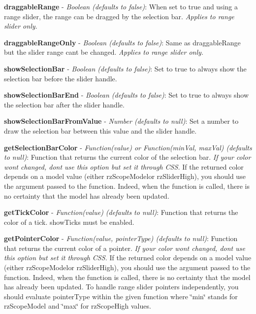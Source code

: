 {\bfseries draggable\+Range} -\/ {\itshape Boolean (defaults to false)}\+: When set to true and using a range slider, the range can be dragged by the selection bar. {\itshape Applies to range slider only.}

{\bfseries draggable\+Range\+Only} -\/ {\itshape Boolean (defaults to false)}\+: Same as draggable\+Range but the slider range can\textquotesingle{}t be changed. {\itshape Applies to range slider only.}

{\bfseries show\+Selection\+Bar} -\/ {\itshape Boolean (defaults to false)}\+: Set to true to always show the selection bar before the slider handle.

{\bfseries show\+Selection\+Bar\+End} -\/ {\itshape Boolean (defaults to false)}\+: Set to true to always show the selection bar after the slider handle.

{\bfseries show\+Selection\+Bar\+From\+Value} -\/ {\itshape Number (defaults to null)}\+: Set a number to draw the selection bar between this value and the slider handle.

{\bfseries get\+Selection\+Bar\+Color} -\/ {\itshape Function(value) or Function(min\+Val, max\+Val) (defaults to null)}\+: Function that returns the current color of the selection bar. {\itshape If your color won\textquotesingle{}t changed, don\textquotesingle{}t use this option but set it through C\+SS.} If the returned color depends on a model value (either {\ttfamily rz\+Scope\+Model}or {\ttfamily \textquotesingle{}rz\+Slider\+High}), you should use the argument passed to the function. Indeed, when the function is called, there is no certainty that the model has already been updated.

{\bfseries get\+Tick\+Color} -\/ {\itshape Function(value) (defaults to null)}\+: Function that returns the color of a tick. show\+Ticks must be enabled.

{\bfseries get\+Pointer\+Color} -\/ {\itshape Function(value, pointer\+Type) (defaults to null)}\+: Function that returns the current color of a pointer. {\itshape If your color won\textquotesingle{}t changed, don\textquotesingle{}t use this option but set it through C\+SS.} If the returned color depends on a model value (either {\ttfamily rz\+Scope\+Model}or {\ttfamily \textquotesingle{}rz\+Slider\+High}), you should use the argument passed to the function. Indeed, when the function is called, there is no certainty that the model has already been updated. To handle range slider pointers independently, you should evaluate pointer\+Type within the given function where \char`\"{}min\char`\"{} stands for {\ttfamily rz\+Scope\+Model} and \char`\"{}max\char`\"{} for {\ttfamily rz\+Scope\+High} values.


